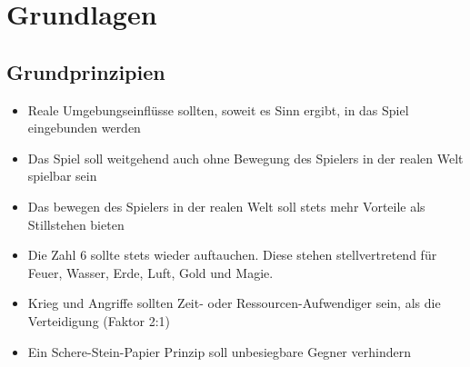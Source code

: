 \chapter{Grundlagen}
\label{Grundlagen}

\section{Grundprinzipien}
\begin{itemize}
\item Reale Umgebungseinflüsse sollten, soweit es Sinn ergibt, in das Spiel eingebunden werden
\item Das Spiel soll weitgehend auch ohne Bewegung des Spielers in der realen Welt spielbar sein
\item Das bewegen des Spielers in der realen Welt soll stets mehr Vorteile als Stillstehen bieten
\item Die Zahl 6 sollte stets wieder auftauchen. Diese stehen stellvertretend für Feuer, Wasser, Erde, Luft, Gold und Magie.
\item Krieg und Angriffe sollten Zeit- oder Ressourcen-Aufwendiger sein, als die Verteidigung (Faktor 2:1)
\item Ein Schere-Stein-Papier Prinzip soll unbesiegbare Gegner verhindern

\end{itemize}